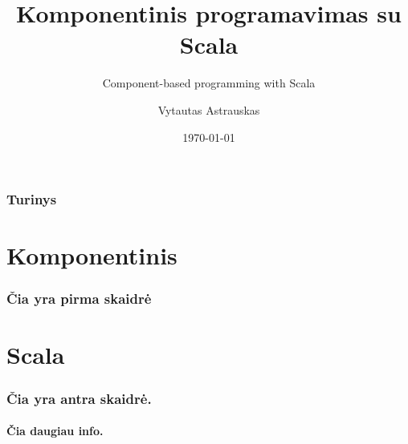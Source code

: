 \documentclass[xetex,mathserif,serif]{beamer}
\title{Komponentinis programavimas su Scala}
\subtitle{Component-based programming with Scala}
\author{Vytautas Astrauskas}
\institute{
Vilniaus universitetas\\
Matematikos ir informatikos fakultetas\\
Programų sistemų katedra%
}
\date{\today}
\begin{document}
  \frame{\titlepage}

  \begin{frame}
  \frametitle{Turinys}
  \tableofcontents[currentsection]
  \end{frame}

  \section{Komponentinis}
  \begin{frame}
    \frametitle{Čia yra pirma skaidrė}
  \end{frame}

  \section{Scala}
  \begin{frame}
    \frametitle{Čia yra antra skaidrė.}
    \framesubtitle{Čia daugiau info.}
  \end{frame}
\end{document}
